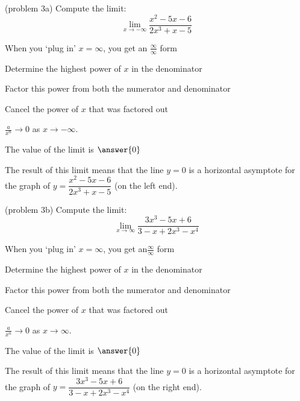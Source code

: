 \documentclass[handout]{ximera}
\begin{document}
\begin{problem}(problem 3a)
  Compute the limit:
  \[
  \lim_{x \to -\infty} \frac{x^2 - 5x - 6}{2x^3 + x -5}
  \]
  
    \begin{hint}
      When you `plug in' $x = \infty$, you get an $\frac{\infty}{\infty}$ form
    \end{hint}
    \begin{hint}
      Determine the highest power of $x$ in the denominator
    \end{hint}
    \begin{hint}
      Factor this power from both the numerator and denominator
    \end{hint}
    \begin{hint}
      Cancel the power of $x$ that was factored out
    \end{hint}
    \begin{hint}
      $\frac{a}{x^n} \to 0$ as $x \to -\infty$.
    \end{hint}
		The value of the limit is
		 $\answer{0}$
		
		
		The result of this limit means that the line $y = 0$  is a horizontal asymptote
for the graph of $y = \dfrac{x^2 - 5x - 6}{2x^3 + x -5}$ (on the left end).
\end{problem}


\begin{problem}(problem 3b)
  Compute the limit:
  \[
  \lim_{x \to \infty} \frac{3x^3 - 5x + 6}{3-x+ 2x^3- x^4}
  \]
  
    \begin{hint}
      When you `plug in' $x = \infty$, you get an$\frac{\infty}{\infty}$ form
    \end{hint}
    \begin{hint}
      Determine the highest power of $x$ in the denominator
    \end{hint}
    \begin{hint}
      Factor this power from both the numerator and denominator
    \end{hint}
    \begin{hint}
      Cancel the power of $x$ that was factored out
    \end{hint}
    \begin{hint}
      $\frac{a}{x^n} \to 0$ as $x \to \infty$.
    \end{hint}
		The value of the limit is
		 $\answer{0}$
	
		The result of this limit means that the line $y = 0$  is a horizontal asymptote
for the graph of $y = \dfrac{3x^3 - 5x + 6}{3-x+ 2x^3- x^4}$ (on the right end).
\end{problem}
\end{document}

